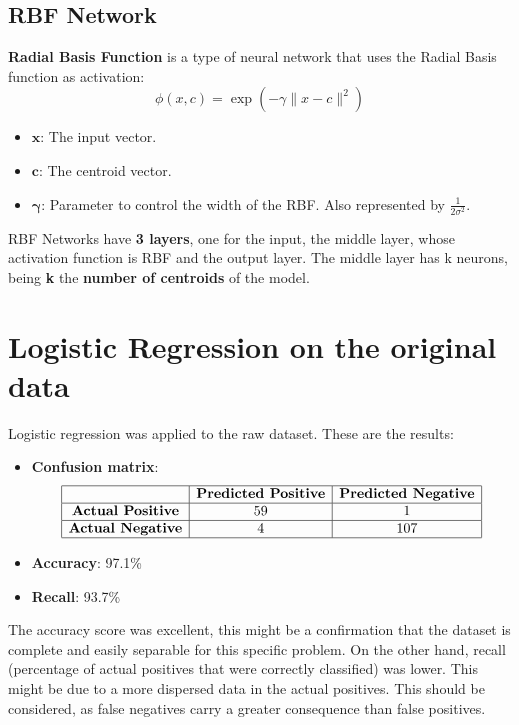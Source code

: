 \documentclass[a4paper,12pt]{article}
\begin{document}
\subsection{RBF Network}
\textbf{Radial Basis Function} is a type of neural network that uses the Radial Basis function as activation:
\[
\phi(x, c) = \exp\left(-\gamma \|x - c\|^2\right)
\]
\begin{itemize}
    \item \(\mathbf{x}\): The input vector.
    \item \(\mathbf{c}\): The centroid vector.
    \item \(\mathbf{\gamma}\): Parameter to control the width of the RBF. Also represented by \(\frac{1}{2\sigma^2}\).
\end{itemize}

RBF Networks have \textbf{3 layers}, one for the input, the middle layer, whose activation function is RBF and the output layer. The middle layer has k neurons, being \textbf{k} the \textbf{number of centroids} of the model. 

\section{Logistic Regression on the original data}
\label{sec:logistic-regression-original}
Logistic regression was applied to the raw dataset. These are the results:
\begin{itemize}
    \item \textbf{Confusion matrix}: 
    \[
    \begin{array}{|c|c|c|}
    \hline
    & \textbf{Predicted Positive} & \textbf{Predicted Negative} \\
    \hline
    \textbf{Actual Positive} & 59 & 1 \\
    \hline
    \textbf{Actual Negative} & 4 & 107 \\
    \hline
    \end{array}
    \]
    \item \textbf{Accuracy}: 97.1\%
    \item \textbf{Recall}: 93.7\%

    
\end{itemize}

The accuracy score was excellent, this might be a confirmation that the dataset is complete and easily separable for this specific problem. On the other hand, recall (percentage of actual positives that were correctly classified) was lower. This might be due to a more dispersed data in the actual positives. This should be considered, as false negatives carry a greater consequence than false positives.
\end{document}

